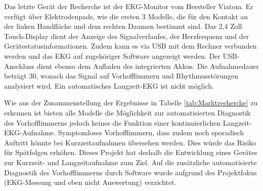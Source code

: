 Das letzte Gerät der Recherche ist der EKG-Monitor vom Hersteller Viatom. Er verfügt über Elektrodenpads, wie die ersten 3 Modelle, die für den Kontakt an der linken Handfläche und dem rechten Daumen bestimmt sind. Das 2,4 Zoll Touch-Display dient der Anzeige des Signalverlaufes, der Herzfrequenz und der Gerätestatusinformationen. Zudem kann es via USB mit dem Rechner verbunden werden und das EKG auf zugehöriger Software angezeigt werden. Der USB-Anschluss dient ebenso dem Aufladen des integrierten Akkus. Die Aufnahmedauer beträgt \SI{30}{\sec}, wonach das Signal auf Vorhofflimmern und Rhythmusstörungen analysiert wird. Ein automatisches Langzeit-EKG ist nicht möglich. 

Wie aus der Zusammenstellung der Ergebnisse in Tabelle \ref{tab:Marktrecherche} zu erkennen ist bieten alle Modelle die Möglichkeit zur automatisierten Diagnostik des Vorhofflimmerns jedoch keines die Funktion einer kontinuierlichen Langzeit-EKG-Aufnahme. Symptomloses Vorhofflimmern, dass zudem noch sporadisch Auftritt könnte bei Kurzzeitaufnahmen übersehen werden. Dies würde das Risiko für Spätfolgen erhöhen. Dieses Projekt hat deshalb die Entwicklung eines Gerätes zur Kurzzeit- und Langzeitaufnahme zum Ziel. Auf die zusätzliche automatisierte Diagnostik des Vorhofflimmerns durch Software wurde aufgrund des Projektfokus (EKG-Messung und eben nicht Auswertung) verzichtet.
